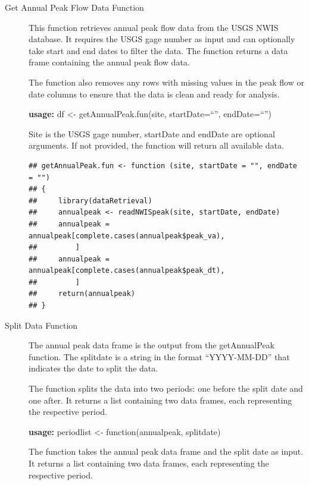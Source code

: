 \documentclass{tufte-handout}\usepackage[]{graphicx}\usepackage[]{xcolor}
\makeatletter
\newenvironment{kframe}{%
 \def\at@end@of@kframe{}%
 \ifinner\ifhmode%
  \def\at@end@of@kframe{\end{minipage}}%
  \begin{minipage}{\columnwidth}%
 \fi\fi%
 \def\FrameCommand##1{\hskip\@totalleftmargin \hskip-\fboxsep
 \colorbox{shadecolor}{##1}\hskip-\fboxsep
     \hskip-\linewidth \hskip-\@totalleftmargin \hskip\columnwidth}%
 \MakeFramed {\advance\hsize-\width
   \@totalleftmargin\z@ \linewidth\hsize
   \@setminipage}}%
 {\par\unskip\endMakeFramed%
 \at@end@of@kframe}
\newenvironment{knitrout}{}{} %
\makeatother
\begin{document}
\begin{description}
  \item[Get Annual Peak Flow Data Function]

This function retrieves annual peak flow data from the USGS NWIS database. It requires the USGS gage number as input and can optionally take start and end dates to filter the data. The function returns a data frame containing the annual peak flow data.

The function also removes any rows with missing values in the peak flow or date columns to ensure that the data is clean and ready for analysis.

\textbf{usage:} df <- getAnnualPeak.fun(site, startDate=``'', endDate=``'')

Site is the USGS gage number, startDate and endDate are optional arguments. If not provided, the function will return all available data.

\begin{knitrout}
\color{fgcolor}\begin{kframe}
\begin{verbatim}
## getAnnualPeak.fun <- function (site, startDate = "", endDate = "") 
## {
##     library(dataRetrieval)
##     annualpeak <- readNWISpeak(site, startDate, endDate)
##     annualpeak = annualpeak[complete.cases(annualpeak$peak_va), 
##         ]
##     annualpeak = annualpeak[complete.cases(annualpeak$peak_dt), 
##         ]
##     return(annualpeak)
## }
\end{verbatim}
\end{kframe}
\end{knitrout}




\item[Split Data Function]

The annual peak data frame is the output from the getAnnualPeak function. The splitdate is a string in the format ``YYYY-MM-DD'' that indicates the date to split the data.

The function splits the data into two periods: one before the split date and one after. It returns a list containing two data frames, each representing the respective period.

\textbf{usage:} periodlist <- function(annualpeak, splitdate)

The function takes the annual peak data frame and the split date as input. It returns a list containing two data frames, each representing the respective period.


\end{description}
\end{document}
